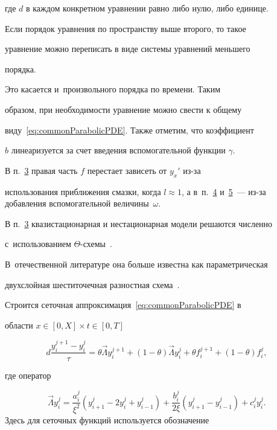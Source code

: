 где $d$ в каждом конкретном уравнении равно либо нулю, либо единице.

Если порядок уравнения по пространству выше второго, то такое

уравнение можно переписать в виде системы уравнений меньшего

порядка. 

Это касается и~произвольного порядка по времени. Таким

образом, при необходимости уравнение можно свести к общему

виду~\eqref{eq:commonParabolicPDE}. Также отметим, что коэффициент

$b$ линеаризуется за счет введения вспомогательной функции $\gamma$.

В п.~\hyperlink{kol:3}{3} правая часть $f$ перестает зависеть от $y_x'$ из-за

использования приближения смазки, когда $l\approx 1$, а в~п.~\hyperlink{kol:4}{4} и~\hyperlink{kol:5}{5}~--- из-за добавления вспомогательной величины~$\omega$.



В п.~\hyperlink{kol:3}{3} квазистационарная и нестационарная модели решаются численно

с~использованием $\Theta$-схемы~\cite{StuartPeplow1991}. 

В~отечественной литературе она больше известна как параметрическая

двухслойная шеститочечная разностная схема~\cite{Samarskii1989}.

Строится сеточная аппроксимация~\eqref{eq:commonParabolicPDE} в

области $x\in[0,X]\times t\in[0,T]$

\begin{equation}\label{eq:ThetaScheam}

d\frac{y_i^{j+1}-y_i^j}{\tau}=\theta \Vec \Lambda

y_i^{j+1}+(1-\theta)\Vec \Lambda y_i^j+\theta

f_i^{j+1}+(1-\theta)f_i^j,

\end{equation}

где оператор 

$$

\Vec \Lambda y_i^j=\frac{a_i^j}{\xi^2}(y_{i+1}^j -

2y_i^j + y_{i-1}^j)+\frac{b_i^j}{2\xi}(y_{i+1}^j-y_{i-1}^j)+c_i^j

y_i^j.

$$ Здесь для сеточных функций используется обозначение

